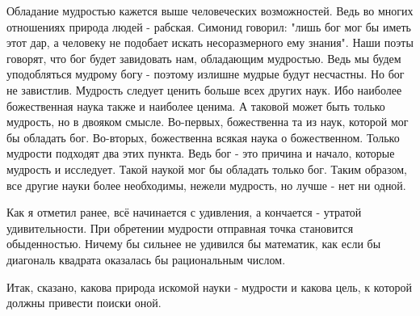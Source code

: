 \documentclass{article}
\begin{document}
Обладание мудростью кажется выше человеческих возможностей. Ведь во многих отношениях природа людей - рабская. Симонид говорил: "лишь бог мог бы иметь этот дар, а человеку не подобает искать несоразмерного ему знания". Наши поэты говорят, что бог будет завидовать нам, обладающим мудростью. Ведь мы будем уподобляться мудрому богу - поэтому излишне мудрые будут несчастны. Но бог не завистлив. Мудрость следует ценить больше всех других наук. Ибо наиболее божественная наука также и наиболее ценима. А таковой может быть только мудрость, но в двояком смысле. Во-первых, божественна та из наук, которой мог бы обладать бог. Во-вторых, божественна всякая наука о божественном. Только мудрости подходят два этих пункта. Ведь бог - это причина и начало, которые мудрость и исследует. Такой наукой мог бы обладать только бог. Таким образом, все другие науки более необходимы, нежели мудрость, но лучше - нет ни одной.

Как я отметил ранее, всё начинается с удивления, а кончается - утратой удивительности. При обретении мудрости отправная точка становится обыденностью. Ничему бы сильнее не удивился бы математик, как если бы диагональ квадрата оказалась бы рациональным числом.

Итак, сказано, какова природа искомой науки - мудрости и какова цель, к которой должны привести поиски оной.
\end{document}
